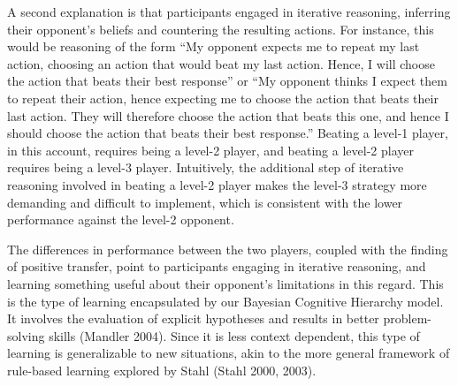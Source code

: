 \documentclass[smallextended]{svjour3}       %
\begin{document}
A second explanation is that participants engaged in iterative
reasoning, inferring their opponent's beliefs and countering the
resulting actions. For instance, this would be reasoning of the form
``My opponent expects me to repeat my last action, choosing an action
that would beat my last action. Hence, I will choose the action that
beats their best response'' or ``My opponent thinks I expect them to
repeat their action, hence expecting me to choose the action that beats
their last action. They will therefore choose the action that beats this
one, and hence I should choose the action that beats their best
response.'' Beating a level-1 player, in this account, requires being a
level-2 player, and beating a level-2 player requires being a level-3
player. Intuitively, the additional step of iterative reasoning involved
in beating a level-2 player makes the level-3 strategy more demanding
and difficult to implement, which is consistent with the lower
performance against the level-2 opponent.

The differences in performance between the two players, coupled with the
finding of positive transfer, point to participants engaging in
iterative reasoning, and learning something useful about their
opponent's limitations in this regard. This is the type of learning
encapsulated by our Bayesian Cognitive Hierarchy model. It involves the
evaluation of explicit hypotheses and results in better problem-solving
skills (Mandler 2004). Since it is less context dependent, this type of
learning is generalizable to new situations, akin to the more general
framework of rule-based learning explored by Stahl (Stahl 2000, 2003).
\end{document}
